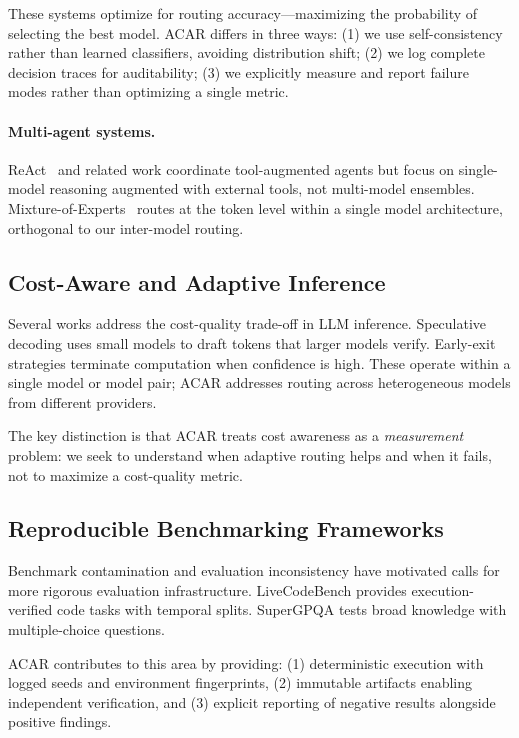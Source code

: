 \documentclass{article}
\newcommand{\acar}{\textsc{ACAR}}
\begin{document}
These systems optimize for routing accuracy---maximizing the probability of selecting the best model. \acar{} differs in three ways: (1) we use self-consistency rather than learned classifiers, avoiding distribution shift; (2) we log complete decision traces for auditability; (3) we explicitly measure and report failure modes rather than optimizing a single metric.

\paragraph{Multi-agent systems.}
ReAct~\citep{react} and related work coordinate tool-augmented agents but focus on single-model reasoning augmented with external tools, not multi-model ensembles. Mixture-of-Experts~\citep{moe} routes at the token level within a single model architecture, orthogonal to our inter-model routing.

\subsection{Cost-Aware and Adaptive Inference}

Several works address the cost-quality trade-off in LLM inference. Speculative decoding uses small models to draft tokens that larger models verify. Early-exit strategies terminate computation when confidence is high. These operate within a single model or model pair; \acar{} addresses routing across heterogeneous models from different providers.

The key distinction is that \acar{} treats cost awareness as a \emph{measurement} problem: we seek to understand when adaptive routing helps and when it fails, not to maximize a cost-quality metric.

\subsection{Reproducible Benchmarking Frameworks}

Benchmark contamination and evaluation inconsistency have motivated calls for more rigorous evaluation infrastructure. LiveCodeBench provides execution-verified code tasks with temporal splits. SuperGPQA tests broad knowledge with multiple-choice questions.

\acar{} contributes to this area by providing: (1) deterministic execution with logged seeds and environment fingerprints, (2) immutable artifacts enabling independent verification, and (3) explicit reporting of negative results alongside positive findings.
\end{document}
